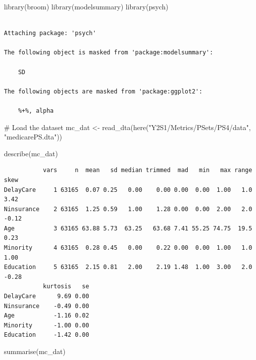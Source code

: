 \documentclass[
  letterpaper,
  DIV=11,
  numbers=noendperiod]{scrartcl}
\newenvironment{Shaded}{\begin{snugshade}}{\end{snugshade}}
\newcommand{\CommentTok}[1]{\textcolor[rgb]{0.37,0.37,0.37}{#1}}
\newcommand{\FunctionTok}[1]{\textcolor[rgb]{0.28,0.35,0.67}{#1}}
\newcommand{\NormalTok}[1]{\textcolor[rgb]{0.00,0.23,0.31}{#1}}
\newcommand{\OtherTok}[1]{\textcolor[rgb]{0.00,0.23,0.31}{#1}}
\newcommand{\StringTok}[1]{\textcolor[rgb]{0.13,0.47,0.30}{#1}}
\begin{document}
\begin{Shaded}
\begin{Highlighting}[]
\FunctionTok{library}\NormalTok{(broom)}
\FunctionTok{library}\NormalTok{(modelsummary)}
\FunctionTok{library}\NormalTok{(psych)}
\end{Highlighting}
\end{Shaded}

\begin{verbatim}

Attaching package: 'psych'

The following object is masked from 'package:modelsummary':

    SD

The following objects are masked from 'package:ggplot2':

    %+%, alpha
\end{verbatim}

\begin{Shaded}
\begin{Highlighting}[]
\CommentTok{\# Load the dataset}
\NormalTok{mc\_dat }\OtherTok{\textless{}{-}} \FunctionTok{read\_dta}\NormalTok{(}\FunctionTok{here}\NormalTok{(}\StringTok{"Y2S1/Metrics/PSets/PS4/data"}\NormalTok{, }\StringTok{"medicarePS.dta"}\NormalTok{))}

\FunctionTok{describe}\NormalTok{(mc\_dat)}
\end{Highlighting}
\end{Shaded}

\begin{verbatim}
           vars     n  mean   sd median trimmed  mad   min   max range  skew
DelayCare     1 63165  0.07 0.25   0.00    0.00 0.00  0.00  1.00   1.0  3.42
Ninsurance    2 63165  1.25 0.59   1.00    1.28 0.00  0.00  2.00   2.0 -0.12
Age           3 63165 63.88 5.73  63.25   63.68 7.41 55.25 74.75  19.5  0.23
Minority      4 63165  0.28 0.45   0.00    0.22 0.00  0.00  1.00   1.0  1.00
Education     5 63165  2.15 0.81   2.00    2.19 1.48  1.00  3.00   2.0 -0.28
           kurtosis   se
DelayCare      9.69 0.00
Ninsurance    -0.49 0.00
Age           -1.16 0.02
Minority      -1.00 0.00
Education     -1.42 0.00
\end{verbatim}

\begin{Shaded}
\begin{Highlighting}[]
\FunctionTok{summarise}\NormalTok{(mc\_dat)}
\end{Highlighting}
\end{Shaded}
\end{document}
